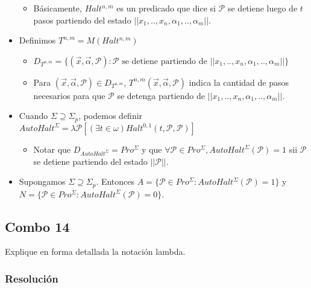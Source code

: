 \documentclass[
]{article}
\providecommand{\tightlist}{%
  \setlength{\itemsep}{0pt}\setlength{\parskip}{0pt}}
\begin{document}
\begin{itemize}
  \begin{itemize}
  \tightlist
  \item
    Básicamente, \(Halt^{n,m}\) es un predicado que dice si
    \(\mathcal{P}\) se detiene luego de \(t\) pasos partiendo del estado
    \(||x_1, .., x_n, \alpha_1, .., \alpha_m||\).
  \end{itemize}
\item
  Definimos \(T^{n,m}=M(Halt^{n,m})\)

  \begin{itemize}
  \tightlist
  \item
    \(D_{T^{n,m}}=\{(\vec{x}, \vec{\alpha}, \mathcal{P}): \mathcal{P}\text{ se detiene partiendo de }||x_1, .., x_n, \alpha_1, .., \alpha_m||\}\)
  \item
    Para \((\vec{x}, \vec{\alpha}, \mathcal{P})\in D_{T^{n,m}}\),
    \(T^{n,m}(\vec{x}, \vec{\alpha}, \mathcal{P})\) indica la cantidad
    de pasos necesarios para que \(\mathcal{P}\) se detenga partiendo de
    \(||x_1, .., x_n, \alpha_1, .., \alpha_m||\).
  \end{itemize}
\item
  Cuando \(\Sigma\supseteq\Sigma_p\), podemos definir
  \(AutoHalt^\Sigma=\lambda\mathcal{P}[(\exists t\in\omega) Halt^{0,1}(t,\mathcal{P},\mathcal{P})]\)

  \begin{itemize}
  \tightlist
  \item
    Notar que \(D_{AutoHalt^\Sigma}=Pro^\Sigma\) y que
    \(\forall\mathcal{P}\in Pro^\Sigma, AutoHalt^\Sigma(\mathcal{P})=1\)
    sii \(\mathcal{P}\) se detiene partiendo del estado
    \(||\mathcal{P}||\).
  \end{itemize}
\item
  Supongamos \(\Sigma\supseteq\Sigma_p\). Entonces
  \(A=\{\mathcal{P}\in Pro^\Sigma: AutoHalt^\Sigma(\mathcal{P})=1\}\) y
  \(N=\{\mathcal{P}\in Pro^\Sigma: AutoHalt^\Sigma(\mathcal{P})=0\}\).
\end{itemize}

\subsection{Combo 14}\label{combo-14}

Explique en forma detallada la notación lambda.

\subsubsection{Resolución}\label{resoluciuxf3n-13}
\end{document}
